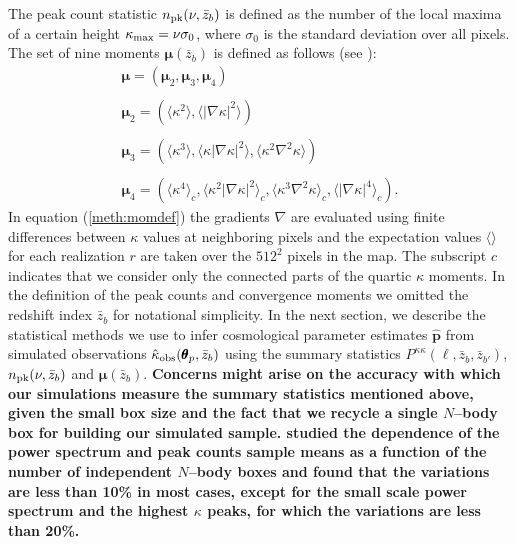 \documentclass[reprint,aps,prd,superscriptaddress,showkeys,showpacs]{revtex4-1}
\newcommand{\bbh}[1]{\mathbf{\hat{#1}}}
\newcommand{\h}[1]{\hat{#1}}
\begin{document}
The peak count statistic $n_{\rm pk}(\nu,\bar{z}_b)$ is defined as the number of the local maxima of a certain height $\kappa_{\rm max}=\nu\sigma_0$, where $\sigma_0$ is the standard deviation over all pixels. The set of nine moments $\pmb{\mu}(\bar{z}_b)$ is defined as follows (see \citep{Matsubara10,Munshi12,MinkPetri}): 
%
\begin{equation}
\label{meth:momdef}
\begin{matrix}
\pmb{\mu} = (\pmb{\mu}_2,\pmb{\mu}_3,\pmb{\mu}_4) \\ \\
\pmb{\mu}_2 = (\langle\kappa^2\rangle,\langle\vert\nabla\kappa\vert^2\rangle) \\ \\
\pmb{\mu}_3 = (\langle\kappa^3\rangle,\langle\kappa\vert\nabla\kappa\vert^2\rangle,\langle\kappa^2\nabla^2\kappa\rangle) \\ \\
\pmb{\mu}_4 = (\langle\kappa^4\rangle_c,\langle\kappa^2\vert\nabla\kappa\vert^2\rangle_c,\langle\kappa^3\nabla^2\kappa\rangle_c,\langle\vert\nabla\kappa\vert^4\rangle_c) .
\end{matrix}
\end{equation}
%
In equation (\ref{meth:momdef}) the gradients $\nabla$ are evaluated using finite differences between $\kappa$ values at neighboring pixels and the expectation values $\langle\rangle$ for each realization $r$ are taken over the $512^2$ pixels in the map. The subscript $c$ indicates that we consider only the connected parts of the quartic $\kappa$ moments. In the definition of the peak counts and convergence moments we omitted the redshift index $\bar{z}_b$ for notational simplicity. In the next section, we describe the statistical methods we use to infer cosmological parameter estimates $\bbh{p}$ from simulated observations $\h{\kappa}_{\rm obs}(\pmb{\theta}_p,\bar{z}_b)$ using the summary statistics $P^{\kappa\kappa}(\ell,\bar{z}_b,\bar{z}_{b'})$, $n_{\rm pk}(\nu,\bar{z}_b)$ and $\pmb{\mu}(\bar{z}_b)$. {\bf \color{red} Concerns might arise on the accuracy with which our simulations measure the summary statistics mentioned above, given the small box size and the fact that we recycle a single $N$--body box for building our simulated sample. \citep{PetriVariance} studied the dependence of the power spectrum and peak counts sample means as a function of the number of independent $N$--body boxes and found that the variations are less than 10\% in most cases, except for the small scale power spectrum and the highest $\kappa$ peaks, for which the variations are less than 20\%. }  
\end{document}
